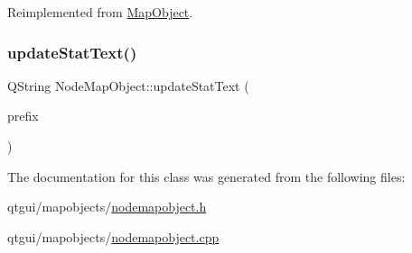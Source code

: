 Reimplemented from \mbox{\hyperlink{class_map_object_afa7cd6a4368f4dd077614ac1d983a6c8}{Map\+Object}}.

\mbox{\label{class_node_map_object_ae0c4325f47620d7efa35f02d1b49a6df}} 
\subsubsection{\texorpdfstring{updateStatText()}{updateStatText()}}
{\footnotesize\ttfamily Q\+String Node\+Map\+Object\+::update\+Stat\+Text (\begin{DoxyParamCaption}\item[{Q\+String}]{prefix }\end{DoxyParamCaption})\hspace{0.3cm}{\ttfamily [protected]}}



The documentation for this class was generated from the following files\+:\begin{DoxyCompactItemize}
\item 
qtgui/mapobjects/\mbox{\hyperlink{nodemapobject_8h}{nodemapobject.\+h}}\item 
qtgui/mapobjects/\mbox{\hyperlink{nodemapobject_8cpp}{nodemapobject.\+cpp}}\end{DoxyCompactItemize}
